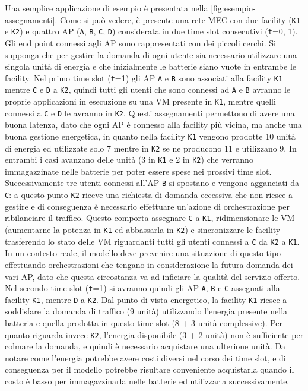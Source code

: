 Una semplice applicazione di esempio è presentata nella \autoref{fig:esempio-assegnamenti}. Come si può vedere, è presente una rete MEC con due facility (\texttt{K1} e \texttt{K2}) e quattro AP (\texttt{A}, \texttt{B}, \texttt{C}, \texttt{D}) considerata in due time slot consecutivi (\texttt{t}=0, 1). Gli end point connessi agli AP sono rappresentati con dei piccoli cerchi. Si supponga che per gestire la domanda di ogni utente sia necessario utilizzare una singola unità di energia e che inizialmente le batterie siano vuote in entrambe le facility. Nel primo time slot (\texttt{t}=1) gli AP \texttt{A} e \texttt{B} sono associati alla facility \texttt{K1} mentre \texttt{C} e \texttt{D} a \texttt{K2}, quindi tutti gli utenti che sono connessi ad \texttt{A} e \texttt{B} avranno le proprie applicazioni in esecuzione su una VM presente in \texttt{K1}, mentre quelli connessi a \texttt{C} e \texttt{D} le avranno in \texttt{K2}. Questi assegnamenti permettono di avere una buona latenza, dato che ogni AP è connesso alla facility più vicina, ma anche una buona gestione energetica, in quanto nella facility \texttt{K1} vengono prodotte 10 unità di energia ed utilizzate solo 7 mentre in \texttt{K2} se ne producono 11 e utilizzano 9. In entrambi i casi avanzano delle unità (3 in \texttt{K1} e 2 in \texttt{K2}) che verranno immagazzinate nelle batterie per poter essere spese nei prossivi time slot. Successivamente tre utenti connessi all'AP \texttt{B} si spostano e vengono agganciati da \texttt{C}: a questo punto \texttt{K2} riceve una richiesta di domanda eccessiva che non riesce a gestire e di conseguenza è necessario effettuare un'azione di orchestrazione per ribilanciare il traffico. Questo comporta assegnare \texttt{C} a \texttt{K1}, ridimensionare le VM (aumentarne la potenza in \texttt{K1} ed abbassarla in \texttt{K2}) e sincronizzare le facility trasferendo lo stato delle VM riguardanti tutti gli utenti connessi a \texttt{C} da \texttt{K2} a \texttt{K1}. In un contesto reale, il modello deve prevenire una situazione di questo tipo effettuando orchestrazioni che tengano in considerazione la futura domanda dei vari AP, dato che questa circostanza va ad inficiare la qualità del servizio offerto. Nel secondo time slot (\texttt{t}=1) si avranno quindi gli AP \texttt{A}, \texttt{B} e \texttt{C} assegnati alla facility \texttt{K1}, mentre \texttt{D} a \texttt{K2}. Dal punto di vista energetico, la facility \texttt{K1} riesce a soddisfare la domanda di traffico (9 unità) utilizzando l'energia presente nella batteria e quella prodotta in questo time slot (8 + 3 unità complessive). Per quanto riguarda invece \texttt{K2}, l'energia disponibile (3 + 2 unità) non è sufficiente per colmare la domanda, e quindi è necessario acquistare una ulterione unità. Da notare come l'energia potrebbe avere costi diversi nel corso dei time slot, e di conseguenza per il modello potrebbe risultare conveniente acquistarla quando il costo è basso per immagazzinarla nelle batterie ed utilizzarla successivamente.
